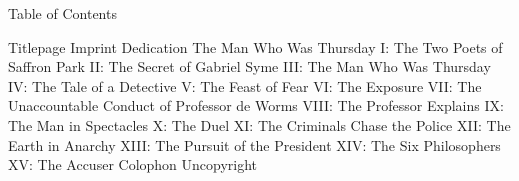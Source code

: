 

    \vfil\break
    \ifodd\pageno\else\leavevmode\vfil\break\fi
Table of Contents

    Titlepage
    Imprint
    Dedication
    The Man Who Was Thursday
        I: The Two Poets of Saffron Park
        II: The Secret of Gabriel Syme
        III: The Man Who Was Thursday
        IV: The Tale of a Detective
        V: The Feast of Fear
        VI: The Exposure
        VII: The Unaccountable Conduct of Professor de Worms
        VIII: The Professor Explains
        IX: The Man in Spectacles
        X: The Duel
        XI: The Criminals Chase the Police
        XII: The Earth in Anarchy
        XIII: The Pursuit of the President
        XIV: The Six Philosophers
        XV: The Accuser
    Colophon
    Uncopyright
